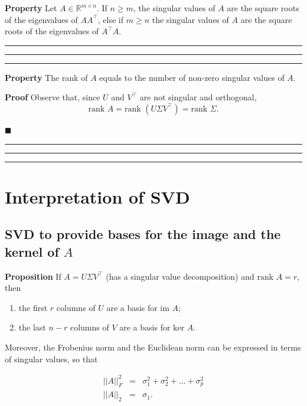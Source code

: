 \documentclass[10pt]{report}
\begin{document}
\textbf{Property} Let \(A \in \mathbb{R}^{m \times n}\). If \(n \geq m\), the singular values of \(A\) are the square roots of the eigenvalues of \(AA^\top\), else if \(m \geq n\) the singular values of \(A\) are the square roots of the eigenvalues of \(A^\top A\).

\vspace*{0.6cm}\hrule
\hrule
\hrule
\vspace*{0.4cm}


\textbf{Property} The rank of \(A\) equals to the number of non\--zero singular values of \(A\).

\textbf{Proof} Observe that, since \(U\) and \(V^\top\) are not singular and orthogonal, $$\mbox{rank }A = \mbox{rank }(U\Sigma V^\top)= \mbox{rank }\Sigma.$$
\begin{flushright}
$\blacksquare$
\end{flushright}

\vspace*{0.6cm}\hrule
\hrule
\hrule
\vspace*{0.4cm}

\section{Interpretation of SVD}
\label{sec:orga4a5673}
\subsection{SVD to provide bases for the image and the kernel of \(A\)}
\label{sec:orge07c853}
\textbf{Proposition} If \(A = U\Sigma V^\top\) (has a singular value decomposition) and \(\mbox{rank }A = r\), then
\begin{enumerate}
\item the first \(r\) columns of \(U\) are a basis for \(\mbox{im }A\);
\item the last \(n - r\) columns of \(V\) are a basis for \(\mbox{ker }A\).
\end{enumerate}

Moreover, the Frobenius norm and the Euclidean norm can be expressed in terms of singular values, so that

\[\begin{array}{lcl} ||A||^2_F & = &  \sigma^2_1 + \sigma^2_2 + \dots + \sigma^2_p \\ ||A||_2 & = & \sigma_1. \end{array}\]
\end{document}

